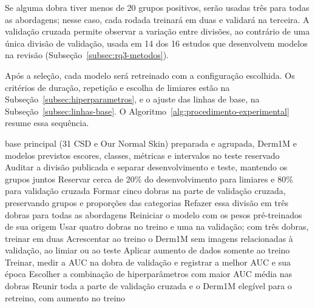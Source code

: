 Se alguma dobra tiver menos de 20 grupos positivos, serão usadas três
para todas as abordagens; nesse caso, cada rodada treinará em duas e
validará na terceira. A validação cruzada permite observar a variação
entre divisões, ao contrário de uma única divisão de validação, usada em
14 dos 16 estudos que desenvolvem modelos na revisão
(Subseção~\ref{subsec:rq3-metodos}).

Após a seleção, cada modelo será retreinado com a configuração escolhida.
Os critérios de duração, repetição e escolha de limiares estão na
Subseção~\ref{subsec:hiperparametros}, e o ajuste das linhas de base, na
Subseção~\ref{subsec:linhas-base}. O
Algoritmo~\ref{alg:procedimento-experimental} resume essa sequência.

\begin{algorithm}[H]
	\caption{Treinamento, seleção e avaliação dos classificadores}
	\label{alg:procedimento-experimental}
	\small
	\renewcommand{\algorithmicif}{\textbf{se}}
	\renewcommand{\algorithmicthen}{\textbf{então}}
	\begin{algorithmic}[1]
		\Require base principal (31 CSD e Our Normal Skin) preparada e agrupada, Derm1M e modelos previstos
		\Ensure escores, classes, métricas e intervalos no teste reservado
		\State Auditar a divisão publicada e separar desenvolvimento e teste, mantendo os grupos juntos
		\State Reservar cerca de 20\% do desenvolvimento para limiares e 80\% para validação cruzada
		\State Formar cinco dobras na parte de validação cruzada, preservando grupos e proporções das categorias
		\State Refazer essa divisão em três dobras para todas as abordagens
		\EndIf
		\State Reiniciar o modelo com os pesos pré-treinados de sua origem
		\State Usar quatro dobras no treino e uma na validação; com três dobras, treinar em duas
		\State Acrescentar ao treino o Derm1M sem imagens relacionadas à validação, ao limiar ou ao teste
		\State Aplicar aumento de dados somente ao treino
		\State Treinar, medir a AUC na dobra de validação e registrar a melhor AUC e sua época
		\EndFor
		\EndFor
		\State Escolher a combinação de hiperparâmetros com maior AUC média nas dobras
		\State Reunir toda a parte de validação cruzada e o Derm1M elegível para o retreino, com aumento no treino

\end{algorithmic}
\end{algorithm}
